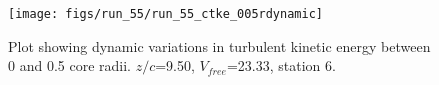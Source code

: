\begin{figure}[H]
\centering
\texttt{[image: figs/run\_55/run\_55\_ctke\_005rdynamic]}
\caption{Plot showing dynamic variations in turbulent kinetic energy between 0 and 0.5 core radii. $z/c$=9.50, $V_{free}$=23.33, station 6.}
\label{fig:run_55_ctke_005rdynamic}
\end{figure}


